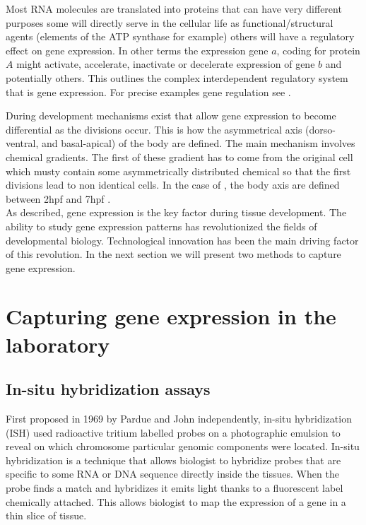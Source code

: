 	Most RNA molecules are translated into proteins that can have very different purposes some will directly serve in the cellular life as functional/structural agents (elements of the ATP synthase for example) others will have a regulatory effect on gene expression. In other terms the expression gene $a$, coding for protein $A$ might activate, accelerate, inactivate or decelerate expression of gene $b$ and potentially others. This outlines the complex interdependent regulatory system that is gene expression. For precise examples gene regulation see \cite{gossen92, shinozaki03,fuqua01,balmer02}.\\
	
	
	During development mechanisms exist that allow gene expression to become differential as the divisions occur. This is how the asymmetrical axis (dorso-ventral, and basal-apical) of the body are defined. The main mechanism involves chemical gradients. The first of these gradient has to come from the original cell which musty contain some asymmetrically distributed chemical so that the first divisions lead to non identical cells. In the case of \platyfull{}, the body axis are defined  between 2hpf and 7hpf \cite{Fischer10}.\\
	
	As described, gene expression is the key factor during tissue development. The ability to study gene expression patterns has revolutionized the fields of developmental biology. Technological innovation has been the main driving factor of this revolution. In the next section we will present two methods to capture gene expression.


\section{Capturing gene expression in the laboratory}
     \subsection{In-situ hybridization assays}
     First proposed in 1969 by Pardue \cite{pardue69} and John \cite{joh69} independently, in-situ hybridization (ISH) used radioactive tritium labelled probes on a photographic emulsion to reveal on which chromosome particular genomic components were located. 
     In-situ hybridization is a technique that allows biologist to hybridize probes that are specific to some RNA or DNA sequence directly inside the tissues. When the probe finds a match and hybridizes it emits light thanks to a fluorescent label chemically attached. This allows biologist to map the expression of a gene in a thin slice of tissue.
     
